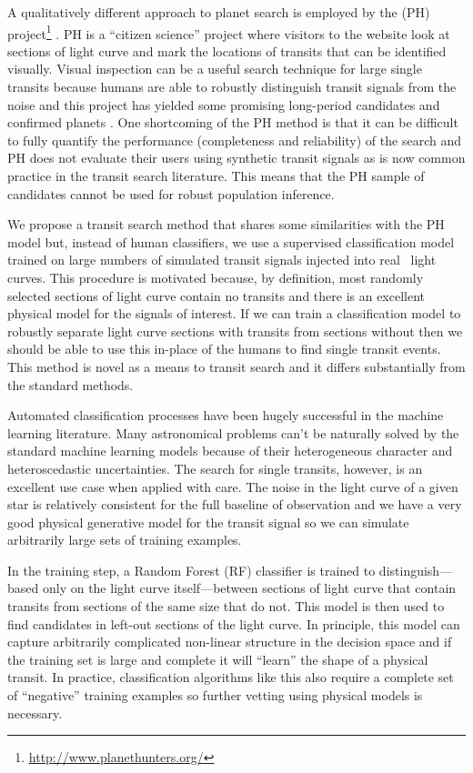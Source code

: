 A qualitatively different approach to planet search is employed by the
 (PH)
project\footnote{\url{http://www.planethunters.org/}} \citep{Fischer:2012}.
PH is a ``citizen science'' project where visitors to the website look at
sections of light curve and mark the locations of transits that can be
identified visually.
Visual inspection can be a useful search technique for large single transits
because humans are able to robustly distinguish transit signals from the noise
and this project has yielded some promising long-period candidates and
confirmed planets \citep[for example][]{Wang:2013}.
One shortcoming of the PH method is that it can be difficult to fully quantify
the performance (completeness and reliability) of the search and PH does not
evaluate their users using synthetic transit signals as is now common practice
in the transit search literature.
This means that the PH sample of candidates cannot be used for robust
population inference.

We propose a transit search method that shares some similarities with the PH
model but, instead of human classifiers, we use a supervised classification
model trained on large numbers of simulated transit signals injected into
real \kepler\ light curves.
This procedure is motivated because, by definition, most randomly selected
sections of light curve contain no transits and there is an excellent physical
model for the signals of interest.
If we can train a classification model to robustly separate light curve
sections with transits from sections without then we should be able to use
this in-place of the humans to find single transit events.
This method is novel as a means to transit search and it differs substantially
from the standard methods.

Automated classification processes have been hugely successful in the machine
learning literature.
Many astronomical problems can't be naturally solved by the standard machine
learning models because of their heterogeneous character and heteroscedastic
uncertainties.
The search for single transits, however, is an excellent use case when applied
with care.
The noise in the light curve of a given star is relatively consistent for the
full baseline of observation and we have a very good physical generative model
for the transit signal so we can simulate arbitrarily large sets of training
examples.

In the training step, a Random Forest (RF) classifier is trained to
distinguish---based only on the light curve itself---between sections of light
curve that contain transits from sections of the same size that do not.
This model is then used to find candidates in left-out sections of the light
curve.
In principle, this model can capture arbitrarily complicated non-linear
structure in the decision space and if the training set is large and complete
it will ``learn'' the shape of a physical transit.
In practice, classification algorithms like this also require a complete set
of ``negative'' training examples so further vetting using physical models
is necessary.


